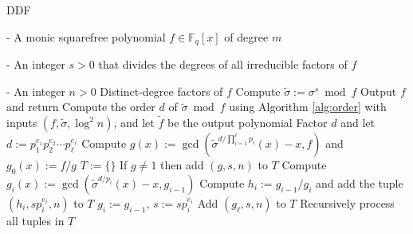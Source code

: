 \documentclass{article}
\theoremstyle{plain}
\theoremstyle{definition}
\newcommand{\algbox}[1]{
	\begin{tcolorbox}[width = 0.8\textwidth, colback = white, arc = 2pt, boxrule = 0.5pt] 
		#1 
	\end{tcolorbox}
}
\def\F{\ensuremath{\mathbb{F}}}
\begin{document}
\begin{algorithm}[t]
	\caption{DDF}
	\label{alg:ddf}
	\centering
	\algbox{
	\begin{algorithmic}[1]
		\Require 
		\item[-] A monic squarefree polynomial $f \in \F_q[x]$ of degree $m$
		\item[-] An integer $s > 0$ that divides the degrees of all irreducible factors of $f$
		\item[-] An integer $n > 0$
		\Ensure Distinct-degree factors of $f$
		\State\label{step:sigma-s}Compute $\tilde{\sigma} := \sigma^s \bmod f$
		\If {$\tilde{\sigma} = $ id}
			\State Output $f$ and return
		\EndIf
		\State\label{step:order}Compute the order $d$ of $\tilde{\sigma} \bmod f$ using Algorithm 
		\ref{alg:order} with inputs $(f, \tilde{\sigma}, \log^2n)$, and let $\tilde{f}$ be the 
		output polynomial
		\State\label{step:factor-d}Factor $d$ and let $d := p_1^{e_1} p_2^{e_2} \cdots 
		p_\ell^{e_\ell}$
		\State\label{step:gcd-first}Compute $g(x) := \gcd(\tilde{\sigma}^{d / \prod_{i = 1}^\ell 
		p_i}(x) - x, f)$ and $g_0(x) := f / g$
		\State $T := \{\}$
		\State\label{step:proper}If $g \ne 1$ then add $(g, s, n)$ to $T$
		\For {$i = 1$ to $\ell$ }\label{step:for-ddf}
			\State Compute $g_i(x) := \gcd(\tilde{\sigma}^{d / p_i}(x) - x, g_{i - 1})$
			\If {$g_i \ne 1$} 
				\State Compute $h_i := g_{i - 1} / g_i$ and add the tuple $(h_i, sp_i^{e_i}, n)$ to 
				$T$
			\Else
				\State $g_i := g_{i - 1}$, $s := sp_i^{e_i}$
			\EndIf
		\EndFor
		\State Add $(g_\ell, s, n)$ to $T$
		\State Recursively process all tuples in $T$
	\end{algorithmic}}
\end{algorithm}
\end{document}
